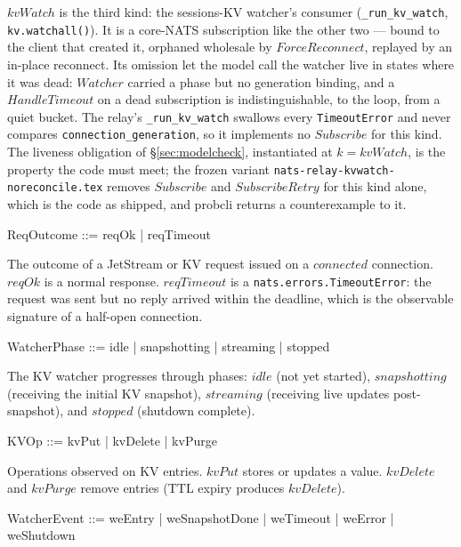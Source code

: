 \documentclass[a4paper,10pt,fleqn]{article}
\begin{document}
$kvWatch$ is the third kind: the sessions-KV watcher's consumer
(\texttt{\_run\_kv\_watch}, \texttt{kv.watchall()}).  It is a core-NATS
subscription like the other two --- bound to the client that created it,
orphaned wholesale by $ForceReconnect$, replayed by an in-place reconnect.
Its omission let the model call the watcher live in states where it was
dead: $Watcher$ carried a phase but no generation binding, and a $HandleTimeout$
on a dead subscription is indistinguishable, to the loop, from a quiet
bucket.  The relay's \texttt{\_run\_kv\_watch} swallows every
\texttt{TimeoutError} and never compares \texttt{connection\_generation},
so it implements no $Subscribe$ for this kind.  The liveness obligation of
\S\ref{sec:modelcheck}, instantiated at $k = kvWatch$, is the property the
code must meet; the frozen variant \texttt{nats-relay-kvwatch-noreconcile.tex}
removes $Subscribe$ and $SubscribeRetry$ for this kind alone, which is the
code as shipped, and probcli returns a counterexample to it.

\begin{zed}
  ReqOutcome ::= reqOk | reqTimeout
\end{zed}

The outcome of a JetStream or KV request issued on a $connected$
connection.  $reqOk$ is a normal response.  $reqTimeout$ is a
\texttt{nats.errors.TimeoutError}: the request was sent but no
reply arrived within the deadline, which is the observable
signature of a half-open connection.

\begin{zed}
  WatcherPhase ::= idle | snapshotting | streaming | stopped
\end{zed}

The KV watcher progresses through phases: $idle$ (not yet started),
$snapshotting$ (receiving the initial KV snapshot), $streaming$
(receiving live updates post-snapshot), and $stopped$ (shutdown
complete).

\begin{zed}
  KVOp ::= kvPut | kvDelete | kvPurge
\end{zed}

Operations observed on KV entries.  $kvPut$ stores or updates a
value.  $kvDelete$ and $kvPurge$ remove entries (TTL expiry
produces $kvDelete$).

\begin{zed}
  WatcherEvent ::=
  weEntry | weSnapshotDone | weTimeout | weError | weShutdown
\end{zed}
\end{document}
